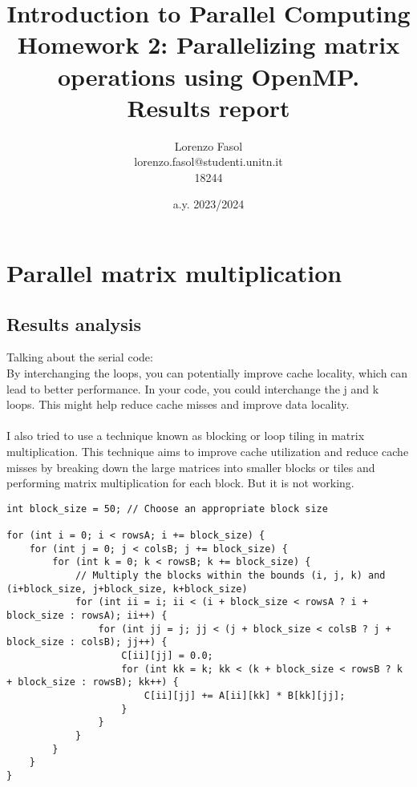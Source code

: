 \documentclass{article}
\begin{document}
\title{Introduction to Parallel Computing\\
    Homework 2: Parallelizing matrix operations using OpenMP.\\
    \textbf{Results report}
}
\author{Lorenzo Fasol\\lorenzo.fasol@studenti.unitn.it\\18244}
\date{a.y. 2023/2024}
\maketitle

\section{Parallel matrix multiplication}

\subsection*{Results analysis}
Talking about the serial code:\\By interchanging the loops, you can potentially improve cache locality, which can lead to better performance. In your code, you could interchange the j and k loops. This might help reduce cache misses and improve data locality.
\\\\I also tried to use a technique known as blocking or loop tiling in matrix multiplication. This technique aims to improve cache utilization and reduce cache misses by breaking down the large matrices into smaller blocks or tiles and performing matrix multiplication for each block. But it is not working.
\begin{code}
    \begin{verbatim}
int block_size = 50; // Choose an appropriate block size

for (int i = 0; i < rowsA; i += block_size) {
    for (int j = 0; j < colsB; j += block_size) {
        for (int k = 0; k < rowsB; k += block_size) {
            // Multiply the blocks within the bounds (i, j, k) and (i+block_size, j+block_size, k+block_size)
            for (int ii = i; ii < (i + block_size < rowsA ? i + block_size : rowsA); ii++) {
                for (int jj = j; jj < (j + block_size < colsB ? j + block_size : colsB); jj++) {
                    C[ii][jj] = 0.0;
                    for (int kk = k; kk < (k + block_size < rowsB ? k + block_size : rowsB); kk++) {
                        C[ii][jj] += A[ii][kk] * B[kk][jj];
                    }
                }
            }
        }
    }
}
    \end{verbatim}
\end{code}
\end{document}
